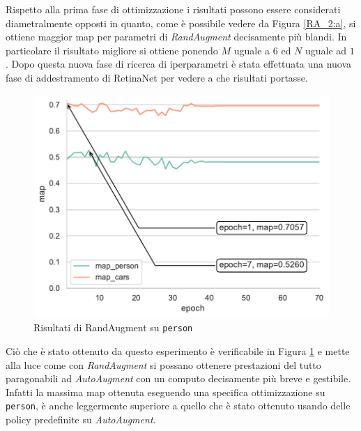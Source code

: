Rispetto alla prima fase di ottimizzazione i risultati possono essere considerati diametralmente opposti in quanto, come è possibile vedere da Figura \ref{RA_2:a}, si ottiene maggior \ac{map} per parametri di \textit{RandAugment} decisamente più blandi. In particolare il risultato migliore si ottiene ponendo $M$ uguale a $6$ ed $N$ uguale ad $1$.
Dopo questa nuova fase di ricerca di iperparametri è stata effettuata una nuova fase di addestramento di RetinaNet per vedere a che risultati portasse.
\begin{figure}[]
    \centering
    \includegraphics[width=\textwidth]{images/graphic/map_person_ra.pdf}
    \caption{Risultati di RandAugment su \texttt{person}}
    \label{fig:ra_person}
\end{figure}

Ciò che è stato ottenuto da questo esperimento è verificabile in Figura \ref{fig:ra_person} e mette alla luce come con \textit{RandAugment} si possano ottenere prestazioni del tutto paragonabili ad \textit{AutoAugment} con un computo decisamente più breve e gestibile. Infatti la massima \ac{map} ottenuta eseguendo una specifica ottimizzazione su \texttt{person}, è anche leggermente superiore a quello che è stato ottenuto usando delle policy predefinite su \textit{AutoAugment}.

